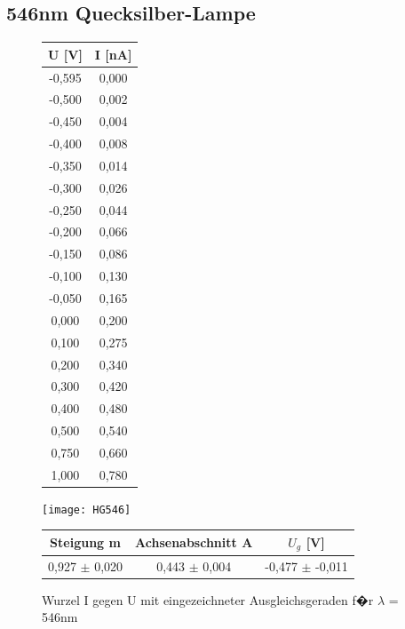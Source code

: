 \documentclass[a4paper, 10pt]{report}%
\begin{document}
\newpage
\subsection{546nm Quecksilber-Lampe}
\begin{figure}[!htbp]
\begin{minipage}[t]{2cm}
\vspace{0pt}
\centering
\begin{center}
\begin{tabular}{c|c}
U [V] & I [nA] \\
\hline
-0,595&	0,000 \\
-0,500&	0,002 \\
-0,450&	0,004 \\
-0,400&	0,008 \\
-0,350&	0,014 \\
-0,300&	0,026 \\
-0,250&	0,044 \\
-0,200&	0,066 \\
-0,150&	0,086 \\
-0,100&	0,130 \\
-0,050&	0,165 \\
0,000&	0,200 \\
0,100&	0,275 \\
0,200&	0,340 \\
0,300&	0,420 \\
0,400&	0,480 \\
0,500&	0,540 \\
0,750&	0,660 \\
1,000&	0,780 \\
\end{tabular}
\end{center}
\end{minipage}
\hfill
\begin{minipage}[t]{12cm}
\vspace{0pt}
\texttt{[image: HG546]}
\caption{Wurzel I gegen U mit eingezeichneter Ausgleichsgeraden f�r $\lambda$ = 546nm}
\begin{center}
\begin{tabular}{c|c|c}
Steigung m & Achsenabschnitt A & $U_g$ [V]\\
\hline
0,927 $\pm$ 0,020 & 0,443 $\pm$	0,004 & -0,477 $\pm$	-0,011
\end{tabular}
\end{center}
\end{minipage}
\end{figure}
	

\newpage
\end{document}
